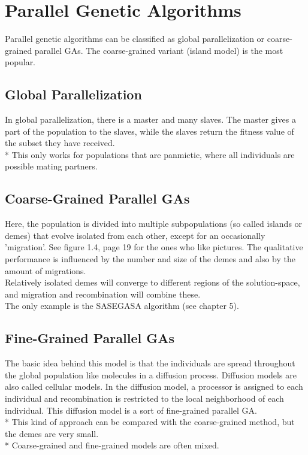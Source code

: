 \documentclass[12pt]{book}
\begin{document}
\section{Parallel Genetic Algorithms}
Parallel genetic algorithms can be classified as global parallelization or coarse-grained parallel GAs. The coarse-grained variant (island model) is the most popular.
\subsection{Global Parallelization}
In global parallelization, there is a master and many slaves. The master gives a part of the population to the slaves, while the slaves return the fitness value of the subset they have received.\\*
This only works for populations that are panmictic, where all individuals are possible mating partners.
\subsection{Coarse-Grained Parallel GAs}
Here, the population is divided into multiple subpopulations (so called islands or demes) that evolve isolated from each other, except for an occasionally 'migration'. See figure 1.4, page 19 for the ones who like pictures. The qualitative performance is influenced by the number and size of the demes and also by the amount of migrations.\\
Relatively isolated demes will converge to different regions of the solution-space, and migration and recombination will combine these.\\ The only example is the SASEGASA algorithm (see chapter 5).
\subsection{Fine-Grained Parallel GAs}
The basic idea behind this model is that the individuals are spread throughout the global population like molecules in a diffusion process. Diffusion models are also called cellular models. In the diffusion model, a processor is assigned to each individual and recombination is restricted to the local neighborhood of each individual. This diffusion model is a sort of fine-grained parallel GA.\\*
This kind of approach can be compared with the coarse-grained method, but the demes are very small.\\*
Coarse-grained and fine-grained models are often mixed.
\end{document}
